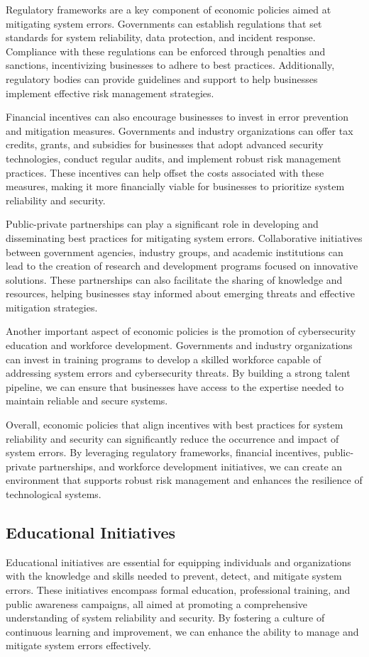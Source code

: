 \documentclass[10pt, conference, letterpaper]{IEEEtran}
\begin{document}
Regulatory frameworks are a key component of economic policies aimed at mitigating system errors. Governments can establish regulations that set standards for system reliability, data protection, and incident response. Compliance with these regulations can be enforced through penalties and sanctions, incentivizing businesses to adhere to best practices. Additionally, regulatory bodies can provide guidelines and support to help businesses implement effective risk management strategies.

Financial incentives can also encourage businesses to invest in error prevention and mitigation measures. Governments and industry organizations can offer tax credits, grants, and subsidies for businesses that adopt advanced security technologies, conduct regular audits, and implement robust risk management practices. These incentives can help offset the costs associated with these measures, making it more financially viable for businesses to prioritize system reliability and security.

Public-private partnerships can play a significant role in developing and disseminating best practices for mitigating system errors. Collaborative initiatives between government agencies, industry groups, and academic institutions can lead to the creation of research and development programs focused on innovative solutions. These partnerships can also facilitate the sharing of knowledge and resources, helping businesses stay informed about emerging threats and effective mitigation strategies.

Another important aspect of economic policies is the promotion of cybersecurity education and workforce development. Governments and industry organizations can invest in training programs to develop a skilled workforce capable of addressing system errors and cybersecurity threats. By building a strong talent pipeline, we can ensure that businesses have access to the expertise needed to maintain reliable and secure systems.

Overall, economic policies that align incentives with best practices for system reliability and security can significantly reduce the occurrence and impact of system errors. By leveraging regulatory frameworks, financial incentives, public-private partnerships, and workforce development initiatives, we can create an environment that supports robust risk management and enhances the resilience of technological systems.

\subsection{Educational Initiatives}
Educational initiatives are essential for equipping individuals and organizations with the knowledge and skills needed to prevent, detect, and mitigate system errors. These initiatives encompass formal education, professional training, and public awareness campaigns, all aimed at promoting a comprehensive understanding of system reliability and security. By fostering a culture of continuous learning and improvement, we can enhance the ability to manage and mitigate system errors effectively.
\end{document}

